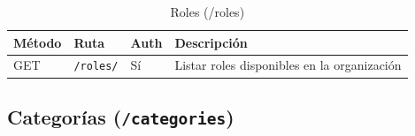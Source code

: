 \begin{longtable}[]{@{}
  >{\raggedright\arraybackslash}p{}
  >{\raggedright\arraybackslash}p{}
  >{\raggedright\arraybackslash}p{}
  >{\raggedright\arraybackslash}p{}@{}}
\caption[Roles (/roles)]{Roles (/roles)}\tabularnewline
\toprule\noalign{}
\begin{minipage}[b]{\linewidth}\raggedright
Método
\end{minipage} & \begin{minipage}[b]{\linewidth}\raggedright
Ruta
\end{minipage} & \begin{minipage}[b]{\linewidth}\raggedright
Auth
\end{minipage} & \begin{minipage}[b]{\linewidth}\raggedright
Descripción
\end{minipage} \\
\midrule\noalign{}
\endhead
\bottomrule\noalign{}
\endlastfoot
GET & \texttt{/roles/} & Sí & Listar roles disponibles en la organización \\
\end{longtable}

\subsection{\texorpdfstring{Categorías (\texttt{/categories})}{Categorías (/categories)}}\label{categoruxedas-categories}


